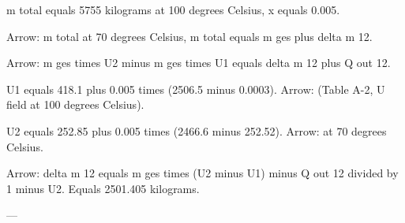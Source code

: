 m total equals 5755 kilograms at 100 degrees Celsius, x equals 0.005.  

Arrow: m total at 70 degrees Celsius, m total equals m ges plus delta m 12.  

Arrow: m ges times U2 minus m ges times U1 equals delta m 12 plus Q out 12.  

U1 equals 418.1 plus 0.005 times (2506.5 minus 0.0003).  
Arrow: (Table A-2, U field at 100 degrees Celsius).  

U2 equals 252.85 plus 0.005 times (2466.6 minus 252.52).  
Arrow: at 70 degrees Celsius.  

Arrow: delta m 12 equals m ges times (U2 minus U1) minus Q out 12 divided by 1 minus U2.  
Equals 2501.405 kilograms.  

---